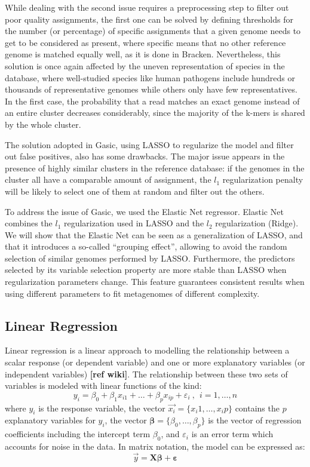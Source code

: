 While dealing with the second issue requires a preprocessing step to filter out poor quality assignments, the first one can be solved by defining thresholds for the number (or percentage) of specific assignments that a given genome needs to get to be considered as present, where specific means that no other reference genome is matched equally well, as it is done in Bracken. Nevertheless, this solution is once again affected by the uneven representation of species in the database, where well-studied species like human pathogens include hundreds or thousands of representative genomes while others only have few representatives. In the first case, the probability that a read matches an exact genome instead of an entire cluster decreases considerably, since the majority of the k-mers is shared by the whole cluster.

The solution adopted in Gasic, using LASSO to regularize the model and filter out false positives, also has some drawbacks. The major issue appears in the presence of highly similar clusters in the reference database: if the genomes in the cluster all have a comparable amount of assignment, the $l_1$ regularization penalty will be likely to select one of them at random and filter out the others.

To address the issue of Gasic, we used the Elastic Net regressor. Elastic Net combines the $l_1$ regularization used in LASSO and the $l_2$ regularization (Ridge). We will show that the Elastic Net can be seen as a generalization of LASSO, and that it introduces a so-called ``grouping effect'', allowing to avoid the random selection of similar genomes performed by LASSO. Furthermore, the predictors selected by its variable selection property are more stable than LASSO when regularization parameters change. This feature guarantees consistent results when using different parameters to fit metagenomes of different complexity.

\subsection{Linear Regression}

Linear regression is a linear approach to modelling the relationship between a scalar response (or dependent variable) and one or more explanatory variables (or independent variables) \textbf{[ref wiki]}. The relationship between these two sets of variables is modeled with linear functions of the kind:
\begin{equation*}
    y_i = \beta_0 + \beta_1 x_{i1} + \dots + \beta_p x_{ip} + \varepsilon_i ~,~~ i = 1, \dots , n
\end{equation*}
where $y_i$ is the response variable, the vector $\vec{x_i} = \{x_i1, \dots, x_ip \}$ contains the $p$ explanatory variables for $y_i$, the vector $\boldsymbol{\beta} = \{\beta_0, \dots, \beta_p \}$ is the vector of regression coefficients including the intercept term $\beta_0$, and $\varepsilon_i$ is an error term which accounts for noise in the data. In matrix notation, the model can be expressed as:
\begin{equation*}
    \vec{y} = \boldsymbol{X}\boldsymbol{\beta} + \boldsymbol{\varepsilon}
\end{equation*}

